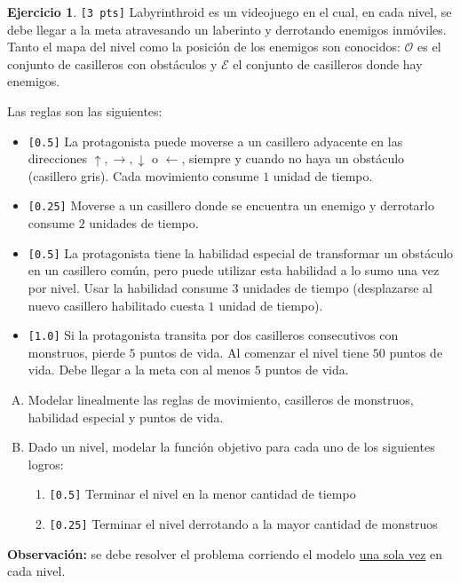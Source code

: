 \documentclass[a4paper,oneside,12pt]{amsart}
\theoremstyle{definition}
\newtheorem{quest}{Ejercicio}
\begin{document}



\begin{quest} \verb|[3 pts]| Labyrinthroid es un videojuego en el cual, en cada nivel, se debe llegar a la meta atravesando un laberinto y derrotando enemigos inmóviles. Tanto el mapa del nivel como la posición de los enemigos son conocidos: $\mathcal{O}$ es el conjunto de casilleros con obstáculos y $\mathcal{E}$ el conjunto de casilleros donde hay enemigos. 

Las reglas son las siguientes:
\begin{itemize}
    \item \verb|[0.5]| La protagonista puede moverse a un casillero adyacente en las direcciones $\uparrow, \rightarrow, \downarrow$ o  $\leftarrow $, siempre y cuando no haya un obstáculo (casillero gris). Cada movimiento consume $1$ unidad de tiempo.
    \item \verb|[0.25]| Moverse a un casillero donde se encuentra un enemigo y derrotarlo consume $2$ unidades de tiempo. 
    \item \verb|[0.5]| La protagonista tiene la habilidad especial de transformar un obstáculo en un casillero común, pero puede utilizar esta habilidad a lo sumo una vez por nivel. Usar la habilidad consume $3$ unidades de tiempo (desplazarse al nuevo casillero habilitado cuesta $1$ unidad de tiempo).
    \item \verb|[1.0]| Si la protagonista transita por dos casilleros consecutivos con monstruos, pierde $5$ puntos de vida. Al comenzar el nivel tiene $50$ puntos de vida. Debe llegar a la meta con al menos $5$ puntos de vida.
\end{itemize}
\begin{enumerate}[A)]
    \item Modelar linealmente las reglas de movimiento, casilleros de monstruos, habilidad especial y puntos de vida.
    \item Dado un nivel, modelar la función objetivo para cada uno de los siguientes logros:
    \begin{enumerate}[1.]
        \item \verb|[0.5]| Terminar el nivel en la menor cantidad de tiempo
        \item \verb|[0.25]| Terminar el nivel derrotando a la mayor cantidad de monstruos
    \end{enumerate}
\end{enumerate}
\textbf{Observación:} se debe resolver el problema corriendo el modelo \underline{una sola vez} en cada nivel. 


\end{quest}


\end{document}
